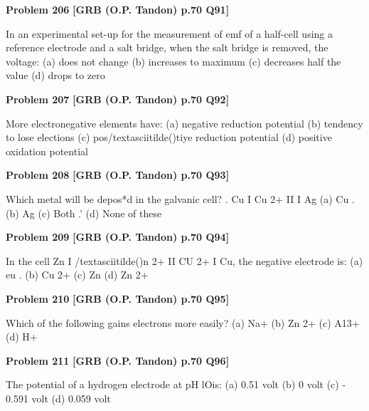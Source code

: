 \begin{problembox}
\textbf{Problem 206} \hfill \textbf{[GRB (O.P. Tandon) p.70 Q91]}
\label{q:ext-grb_all_questions-206}

In an experimental set-up for the measurement of emf of a 
half-cell using a reference electrode and a salt bridge, when 
the salt bridge is removed, the voltage: 
(a) does not change 
(b) increases to maximum 
(c) decreases half the value (d) drops to zero
\end{problembox}

\begin{problembox}
\textbf{Problem 207} \hfill \textbf{[GRB (O.P. Tandon) p.70 Q92]}
\label{q:ext-grb_all_questions-207}

More electronegative elements have: 
(a) negative reduction potential 
(b) tendency to lose elections 
(c) pos/textasciitilde()tiye reduction potential 
(d) positive oxidation potential
\end{problembox}

\begin{problembox}
\textbf{Problem 208} \hfill \textbf{[GRB (O.P. Tandon) p.70 Q93]}
\label{q:ext-grb_all_questions-208}

Which metal will be depos*d in the galvanic cell? . 
Cu I Cu 2+ II 
I Ag 
(a) Cu 
. (b) Ag 
(c) Both 
.' (d) None of these
\end{problembox}

\begin{problembox}
\textbf{Problem 209} \hfill \textbf{[GRB (O.P. Tandon) p.70 Q94]}
\label{q:ext-grb_all_questions-209}

In the cell Zn I /textasciitilde()n 2+ II CU 2+ I Cu, the negative electrode is: 
(a) eu . 
(b) Cu 2+ 
(c) Zn 
(d) Zn 2+
\end{problembox}

\begin{problembox}
\textbf{Problem 210} \hfill \textbf{[GRB (O.P. Tandon) p.70 Q95]}
\label{q:ext-grb_all_questions-210}

Which of the following gains electrons more easily? 
(a) Na+ 
(b) Zn 2+ 
(c) A13+ 
(d) H+
\end{problembox}

\begin{problembox}
\textbf{Problem 211} \hfill \textbf{[GRB (O.P. Tandon) p.70 Q96]}
\label{q:ext-grb_all_questions-211}

The potential of a hydrogen electrode at pH lOis: 
(a) 0.51 volt 
(b) 0 volt 
(c) - 0.591 volt 
(d) 0.059 volt
\end{problembox}

